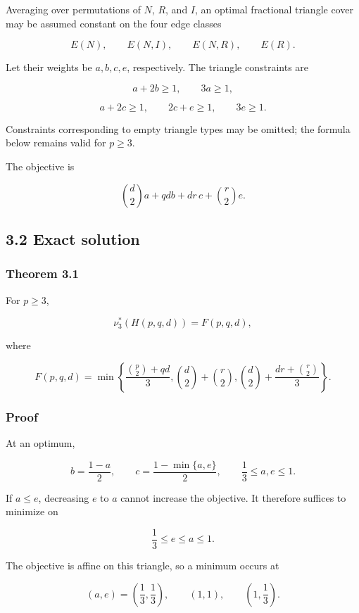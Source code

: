\documentclass[
  11pt,
]{article}
\begin{document}
Averaging over permutations of \(N\), \(R\), and \(I\), an optimal
fractional triangle cover may be assumed constant on the four edge
classes

\[
E(N),
\qquad E(N,I),
\qquad E(N,R),
\qquad E(R).
\]

Let their weights be \(a,b,c,e\), respectively. The triangle constraints
are

\[
a+2b\ge1,
\qquad
3a\ge1,
\tag{3.1}
\]

\[
a+2c\ge1,
\qquad
2c+e\ge1,
\qquad
3e\ge1.
\tag{3.2}
\]

Constraints corresponding to empty triangle types may be omitted; the
formula below remains valid for \(p\ge3\).

The objective is

\[
\binom d2a+qdb+dr\,c+\binom r2e.
\tag{3.3}
\]

\subsection{3.2 Exact solution}\label{exact-solution}

\subsubsection{Theorem 3.1}\label{theorem-3.1-common-profile-formula}

For \(p\ge3\),

\[
\boxed{
\nu_3^*(H(p,q,d))
=
F(p,q,d),
}
\tag{3.4}
\]

where

\[
\boxed{
F(p,q,d)
=
\min\left\{
\frac{\binom p2+qd}{3},
\binom d2+\binom r2,
\binom d2+\frac{dr+\binom r2}{3}
\right\}.
}
\tag{3.5}
\]

\subsubsection{Proof}\label{proof}

At an optimum,

\[
b=\frac{1-a}{2},
\qquad
c=\frac{1-\min\{a,e\}}2,
\qquad
\frac13\le a,e\le1.
\]

If \(a\le e\), decreasing \(e\) to \(a\) cannot increase the objective.
It therefore suffices to minimize on

\[
\frac13\le e\le a\le1.
\]

The objective is affine on this triangle, so a minimum occurs at

\[
(a,e)=\left(\frac13,\frac13\right),
\qquad
(1,1),
\qquad
\left(1,\frac13\right).
\]
\end{document}
